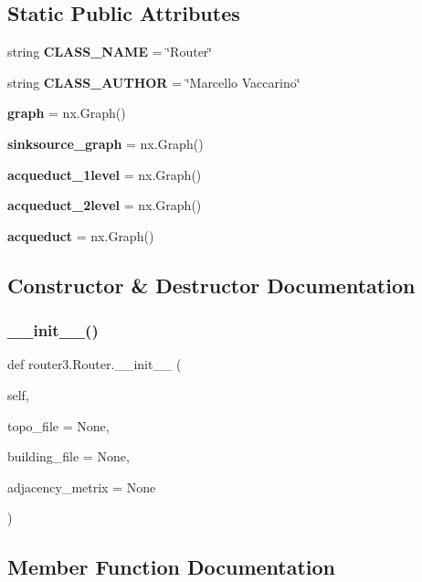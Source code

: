 \subsection*{Static Public Attributes}
\begin{DoxyCompactItemize}
\item 
string \textbf{ C\+L\+A\+S\+S\+\_\+\+N\+A\+ME} = \char`\"{}Router\char`\"{}
\item 
string \textbf{ C\+L\+A\+S\+S\+\_\+\+A\+U\+T\+H\+OR} = \char`\"{}Marcello Vaccarino\char`\"{}
\item 
\textbf{ graph} = nx.\+Graph()
\item 
\textbf{ sinksource\+\_\+graph} = nx.\+Graph()
\item 
\textbf{ acqueduct\+\_\+1level} = nx.\+Graph()
\item 
\textbf{ acqueduct\+\_\+2level} = nx.\+Graph()
\item 
\textbf{ acqueduct} = nx.\+Graph()
\end{DoxyCompactItemize}


\subsection{Constructor \& Destructor Documentation}
\mbox{\label{classrouter3_1_1_router_a02fed902edbc19bef60aabea15706c8e}} 
\subsubsection{\+\_\+\+\_\+init\+\_\+\+\_\+()}
{\footnotesize\ttfamily def router3.\+Router.\+\_\+\+\_\+init\+\_\+\+\_\+ (\begin{DoxyParamCaption}\item[{}]{self,  }\item[{}]{topo\+\_\+file = {\ttfamily None},  }\item[{}]{building\+\_\+file = {\ttfamily None},  }\item[{}]{adjacency\+\_\+metrix = {\ttfamily None} }\end{DoxyParamCaption})}



\subsection{Member Function Documentation}
\mbox{\label{classrouter3_1_1_router_a6282a7594531449b472974795d446c96}} 
